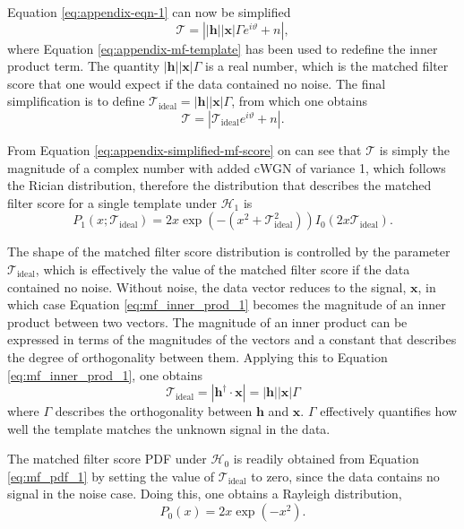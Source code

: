 Equation \ref{eq:appendix-eqn-1} can now be simplified
\begin{equation}
    \mathcal{T}= \left||\mathbf{h}||\mathbf{x}|\Gamma e^{i\vartheta}+n\right|,
\end{equation}
where Equation \ref{eq:appendix-mf-template} has been used to redefine the inner product term. The quantity $|\mathbf{h}||\mathbf{x}|\Gamma$ is a real number, which is the matched filter score that one would expect if the data contained no noise. The final simplification is to define $\mathcal{T}_\mathrm{ideal}=|\mathbf{h}||\mathbf{x}|\Gamma$, from which one obtains
\begin{equation}
    \mathcal{T}=|\mathcal{T}_\mathrm{ideal}e^{i\vartheta}+n|.
    \label{eq:appendix-simplified-mf-score}
\end{equation}

From Equation \ref{eq:appendix-simplified-mf-score} on can see that $\mathcal{T}$ is simply the magnitude of a complex number with added cWGN of variance 1, which follows the Rician distribution, therefore the distribution that describes the matched filter score for a single template under $\mathcal{H}_1$ is
\begin{equation}
    P_1(x;\mathcal{T}_\mathrm{ideal}) = 2x\exp{\left(-\left(x^2+\mathcal{T}_\mathrm{ideal}^2 \right)\right)}I_0(2x\mathcal{T}_\mathrm{ideal}).
    \label{eq:mf_pdf_1}
\end{equation}

The shape of the matched filter score distribution is controlled by the parameter $\mathcal{T}_\mathrm{ideal}$, which is effectively the value of the matched filter score if the data contained no noise. Without noise, the data vector reduces to the signal, $\mathbf{x}$, in which case Equation \ref{eq:mf_inner_prod_1} becomes the magnitude of an inner product between two vectors. The magnitude of an inner product can be expressed in terms of the magnitudes of the vectors and a constant that describes the degree of orthogonality between them. Applying this to Equation \ref{eq:mf_inner_prod_1}, one obtains
\begin{equation}
    \mathcal{T}_\mathrm{ideal}=\left|\mathbf{h}^\dagger\cdot\mathbf{x}\right| = \left|\mathbf{h}\right|\left|\mathbf{x}\right|\Gamma
\end{equation}
where $\Gamma$ describes the orthogonality between $\mathbf{h}$ and $\mathbf{x}$. $\Gamma$ effectively quantifies how well the template matches the unknown signal in the data.

The matched filter score PDF under $\mathcal{H}_0$ is readily obtained from Equation \ref{eq:mf_pdf_1} by setting the value of $\mathcal{T}_\mathrm{ideal}$ to zero, since the data contains no signal in the noise case. Doing this, one obtains a Rayleigh distribution,
\begin{equation}
    P_0(x) = 2x\exp{\left(-x^2\right)}.
    \label{eq:mf_pdf_0}
\end{equation}

